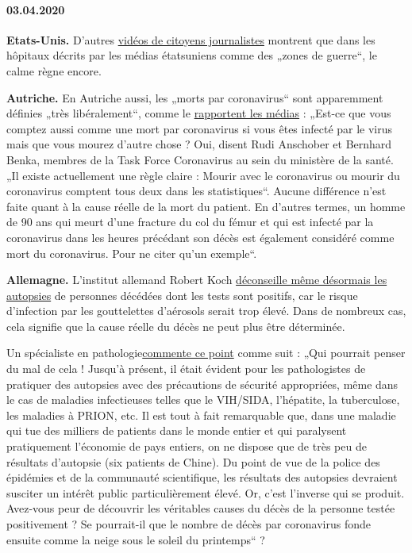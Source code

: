 \hypertarget{03042020}{%
\paragraph{03.04.2020}\label{03042020}}

\textbf{Etats-Unis.} D'autres
\href{https://www.youtube.com/watch?v=5pIMD1enwd4}{vidéos de citoyens
journalistes} montrent que dans les hôpitaux décrits par les médias
étatsuniens comme des „zones de guerre``, le calme règne encore.

\textbf{Autriche.} En Autriche aussi, les „morts par coronavirus`` sont
apparemment définies „très libéralement``, comme le
\href{https://www.heute.at/s/osterreich-bei-corona-todesstatistik-sehr-liberal-48665863}{rapportent
les médias} : „Est-ce que vous comptez aussi comme une mort par
coronavirus si vous êtes infecté par le virus mais que vous mourez
d'autre chose ? Oui, disent Rudi Anschober et Bernhard Benka, membres de
la Task Force Coronavirus au sein du ministère de la santé. „Il existe
actuellement une règle claire : Mourir avec le coronavirus ou mourir du
coronavirus comptent tous deux dans les statistiques``. Aucune
différence n'est faite quant à la cause réelle de la mort du patient. En
d'autres termes, un homme de 90 ans qui meurt d'une fracture du col du
fémur et qui est infecté par la coronavirus dans les heures précédant
son décès est également considéré comme mort du coronavirus. Pour ne
citer qu'un exemple``.

\textbf{Allemagne.} L'institut allemand Robert Koch
\href{https://www.youtube.com/watch?v=gSn_YaOYYcY}{déconseille même
désormais les autopsies} de personnes décédées dont les tests sont
positifs, car le risque d'infection par les gouttelettes d'aérosols
serait trop élevé. Dans de nombreux cas, cela signifie que la cause
réelle du décès ne peut plus être déterminée.

Un spécialiste en
pathologie\href{https://www.youtube.com/watch?v=gSn_YaOYYcY}{commente ce
point} comme suit : „Qui pourrait penser du mal de cela ! Jusqu'à
présent, il était évident pour les pathologistes de pratiquer des
autopsies avec des précautions de sécurité appropriées, même dans le cas
de maladies infectieuses telles que le VIH/SIDA, l'hépatite, la
tuberculose, les maladies à PRION, etc. Il est tout à fait remarquable
que, dans une maladie qui tue des milliers de patients dans le monde
entier et qui paralysent pratiquement l'économie de pays entiers, on ne
dispose que de très peu de résultats d'autopsie (six patients de Chine).
Du point de vue de la police des épidémies et de la communauté
scientifique, les résultats des autopsies devraient susciter un intérêt
public particulièrement élevé. Or, c'est l'inverse qui se produit.
Avez-vous peur de découvrir les véritables causes du décès de la
personne testée positivement ? Se pourrait-il que le nombre de décès par
coronavirus fonde ensuite comme la neige sous le soleil du printemps`` ?

